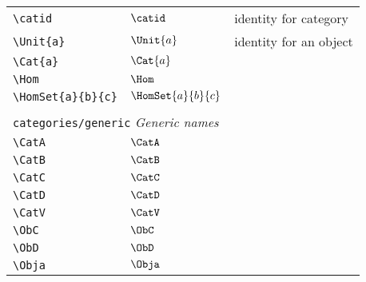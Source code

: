 \begin{longtable}{lll}
  {\color[rgb]{0.5,0.5,0.5}\texttt{\textbackslash catid}}                                                   & $\catid$                   & identity for category\\
  {\color[rgb]{0.5,0.5,0.5}\texttt{\textbackslash Unit\{a\}}}                                               & $\Unit{a}$                 & identity for an object\\
  {\color[rgb]{0.5,0.5,0.5}\texttt{\textbackslash Cat\{a\}}}                                                & $\Cat{a}$                  & \\
  {\color[rgb]{0.5,0.5,0.5}\texttt{\textbackslash Hom}}                                                     & $\Hom$                     & \\
  {\color[rgb]{0.5,0.5,0.5}\texttt{\textbackslash HomSet\{a\}\{b\}\{c\}}}                                   & $\HomSet{a}{b}{c}$
  &
  \\
  &                            &                                                         \\
  \multicolumn{3}{l}{{\color[rgb]{0.5,0.5,0.5}\texttt{categories/generic}} \emph{Generic names}}
  \\
  \hline
  {\color[rgb]{0.5,0.5,0.5}\texttt{\textbackslash CatA}}                                                    & $\CatA$                    & \\
  {\color[rgb]{0.5,0.5,0.5}\texttt{\textbackslash CatB}}                                                    & $\CatB$                    & \\
  {\color[rgb]{0.5,0.5,0.5}\texttt{\textbackslash CatC}}                                                    & $\CatC$                    & \\
  {\color[rgb]{0.5,0.5,0.5}\texttt{\textbackslash CatD}}                                                    & $\CatD$                    & \\
  {\color[rgb]{0.5,0.5,0.5}\texttt{\textbackslash CatV}}                                                    & $\CatV$                    & \\
  {\color[rgb]{0.5,0.5,0.5}\texttt{\textbackslash ObC}}                                                     & $\ObC$                     & \\
  {\color[rgb]{0.5,0.5,0.5}\texttt{\textbackslash ObD}}                                                     & $\ObD$                     & \\
  {\color[rgb]{0.5,0.5,0.5}\texttt{\textbackslash Obja}}                                                    & $\Obja$                    & \\

\end{longtable}
